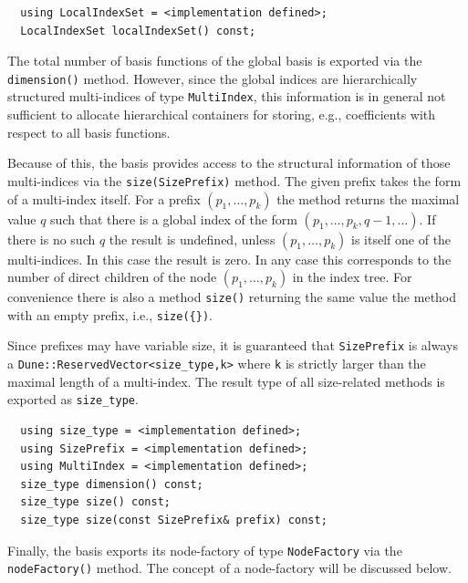\documentclass[a4paper,10pt,headings=normal,bibliography=totoc]{scrartcl}
\begin{document}
\begin{lstlisting}
  using LocalIndexSet = <implementation defined>;
  LocalIndexSet localIndexSet() const;
\end{lstlisting}

The total number of basis functions of the global basis is
exported via the \texttt{dimension()} method. However, since
the global indices are hierarchically structured multi-indices
of type \texttt{MultiIndex}, this information is in general not
sufficient to allocate hierarchical containers for storing,
e.g., coefficients with respect to all basis functions.

Because of this, the basis provides access to the structural
information of those multi-indices via the \texttt{size(SizePrefix)}
method. The given prefix takes the form of a multi-index itself.
For a prefix $(p_1,\dots,p_k)$ the method returns the maximal value $q$ such that there
is a global index of the form $(p_1,\dots,p_k,q-1,\dots)$.
If there is no such $q$ the result is undefined, unless
$(p_1,\dots,p_k)$ is itself one of the multi-indices.
In this case the result is zero.
In any case this corresponds to the number of direct children
of the node $(p_1,\dots,p_k)$ in the index tree.
For convenience there is also a method \texttt{size()} returning the same
value the method with an empty prefix, i.e., \texttt{size(\{\})}.

Since prefixes may have variable size, it is guaranteed that \texttt{SizePrefix}
is always a \texttt{Dune::ReservedVector<size\_type,k>} where \texttt{k}
is strictly larger than the maximal length of a multi-index. The result
type of all size-related methods is exported as \texttt{size\_type}.

\begin{lstlisting}
  using size_type = <implementation defined>;
  using SizePrefix = <implementation defined>;
  using MultiIndex = <implementation defined>;
  size_type dimension() const;
  size_type size() const;
  size_type size(const SizePrefix& prefix) const;
\end{lstlisting}

Finally, the basis exports its node-factory of type \texttt{NodeFactory}
via the \texttt{nodeFactory()} method. The concept of a node-factory
will be discussed below.
\end{document}
